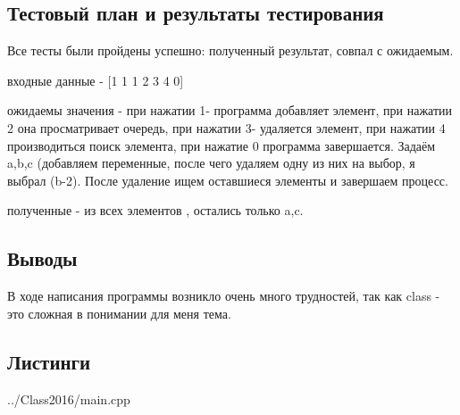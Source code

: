 \documentclass[12pt,a4paper]{report}
\begin{document}
\subsection{Тестовый план и результаты тестирования}

Все тесты были пройдены успешно: полученный результат, совпал с ожидаемым.

\item входные данные - [1 1 1 2 3 4 0]

ожидаемы значения - при нажатии 1- программа добавляет элемент, при нажатии 2 она просматривает очередь, при нажатии 3- удаляется элемент, при нажатии 4 производиться поиск элемента, при нажатие 0 программа завершается. Задаём a,b,c (добавляем переменные, после чего удаляем одну из них на выбор, я выбрал (b-2). После удаление ищем оставшиеся элементы и завершаем процесс.

полученные - из всех элементов , остались только a,c. 

\subsection{Выводы}
В ходе написания программы возникло очень много трудностей, так как class - это сложная в понимании для меня тема.

\subsection*{Листинги}

{../Class2016/main.cpp}
\end{document}
